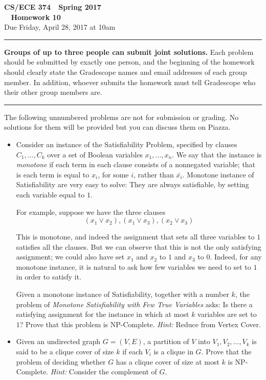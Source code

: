 \documentclass[11pt]{article}
\begin{document}

\thispagestyle{empty}

\begin{center}
\Large\textbf{CS/ECE 374 \,\decosix\,  Spring 2017}%
\\
\LARGE\textbf{\decothreeleft~ Homework 10 ~\decothreeright}%
\\[0.5ex]
\large Due Friday, April 28, 2017 at 10am
\end{center}

\bigskip
\hrule
\bigskip

\noindent
\textbf{Groups of up to three people can submit joint solutions.}  Each problem should be submitted by exactly one person, and the beginning of the homework should clearly state the Gradescope names and email addresses of each group member.  In addition, whoever submits the homework must tell Gradescope who their other group members are.
\bigskip
\hrule
\bigskip


\noindent
The following unnumbered problems are not for submission or grading. 
No solutions for them will be provided but you can discuss them on Piazza.
\begin{itemize}
\item Consider an instance of the Satisfiability Problem, specified by clauses $C_1,\dots,C_k$ over a set of Boolean variables $x_1,\dots,x_n$. We say that the instance is {\em monotone} if each term in each clause consists of a nonnegated variable; that is each term is equal to $x_i$, for some $i$, rather than $\bar{x_i}$. Monotone instance of Satisfiability are very easy to solve: They are always satisfiable, by setting each variable equal to $1$.

For example, suppose we have the three clauses
$$(x_1\vee x_2),(x_1\vee x_3),(x_2\vee x_3)$$

This is monotone, and indeed the assignment that sets all three variables to $1$ satisfies all the clauses. But we can observe that this is not the only satisfying assignment; we could also have set $x_1$ and $x_2$ to $1$ and $x_3$ to $0$. Indeed, for any monotone instance, it is natural to ask how few variables we need to set to $1$ in order to satisfy it.

Given a monotone instance of Satisfiability, together with a number $k$, the problem of {\em Monotone Satisfiability with Few True Variables} asks: Is there a satisfying assignment for the instance in which at most $k$ variables are set to $1$? Prove that this problem is NP-Complete. {\em Hint:} Reduce from 
Vertex Cover.

\item Given an undirected graph $G=(V,E)$, a partition of $V$
  into $V_1,V_2,\ldots,V_k$ is said to be a clique cover of size $k$
  if each $V_i$ is a clique in $G$. Prove that the problem
  of deciding whether $G$ has a clique cover of size at most $k$ is
  NP-Complete. {\em Hint:} Consider the complement of $G$.
\end{itemize}
\end{document}
